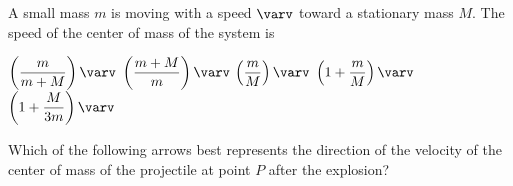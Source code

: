 \documentclass{../../oss-classkick-exam}
\begin{document}
\begin{multicols*}{2}
\begin{questions}
    \question A small mass $m$ is moving with a speed $\varv$ toward a
    stationary mass $M$. The speed of the center of mass of the system is
    \begin{choices}
      \choice $\left(\dfrac m{m+M}\right)\varv$
      \choice $\left(\dfrac{m+M} m\right)\varv$
      \choice $\left(\dfrac mM\right)\varv$
      \choice $\left(1+\dfrac mM\right)\varv$
      \choice $\left(1+\dfrac M{3m}\right)\varv$
    \end{choices}



    \question Which of the following arrows best represents the direction of the
    velocity of the center of mass of the projectile at point $P$ after the
    explosion?
    \label{cm1}
    \begin{choices}
      \choice{\huge$\leftarrow$}
      \choice{\huge$\swarrow$}
      \choice{\huge$\searrow$}
      \choice{\huge$\rightarrow$}
      \choice{\huge$\nearrow$}
    \end{choices}
    

\end{questions}
\end{multicols*}
\end{document}
